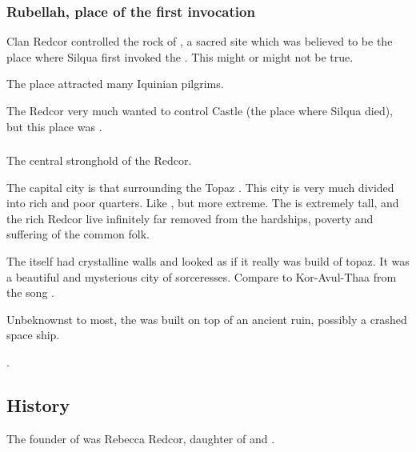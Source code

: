 \subsubsection{Rubellah, place of the first invocation}
Clan Redcor controlled the rock of , a sacred site which was believed to be the {place where Silqua first invoked the \sephiroth}.
This might or might not be true.

The place attracted many Iquinian pilgrims. 

The Redcor very much wanted to control Castle  (the {place where Silqua died}), but this place was .





\subsubsection{\TopazChateau}
\index{\TopazChateau}
The central stronghold of the Redcor. 

The capital city is that surrounding the Topaz \Chateau. This city is very much divided into rich and poor quarters. Like , but more extreme. The \Chateau{} is extremely tall, and the rich Redcor live infinitely far removed from the hardships, poverty and suffering of the common folk. 

The \Chateau itself had crystalline walls and looked as if it really was build of topaz. 
It was a beautiful and mysterious city of sorceresses. 
Compare to Kor-Avul-Thaa from the song . 

Unbeknownst to most, the \TopazChateau was built on top of an ancient \bane ruin, possibly a crashed space ship. 

\Belzir {}.









\subsection{History}
The founder of \ClanRedcor was Rebecca Redcor, daughter of  and . 





